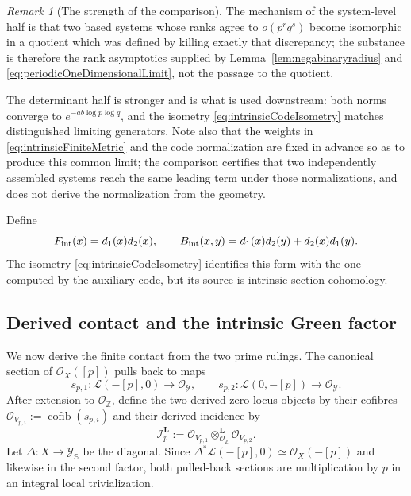 \documentclass[11pt]{amsart}
\theoremstyle{definition}
\theoremstyle{remark}
\newtheorem{remark}[theorem]{Remark}
\newcommand{\Z}{\mathbb Z}
\begin{document}
\begin{remark}[The strength of the comparison]
\label{rem:comparisonstrength}
The mechanism of the
system-level half is that two based systems whose ranks agree to $o(p^rq^s)$
become isomorphic in a quotient which was defined by killing exactly that
discrepancy; the substance is therefore the rank asymptotics supplied by
Lemma~\ref{lem:negabinaryradius} and
\eqref{eq:periodicOneDimensionalLimit}, not the passage to the quotient.

The determinant half is stronger and is what is used downstream: both norms
converge to $e^{-ab\log p\log q}$, and the isometry
\eqref{eq:intrinsicCodeIsometry} matches distinguished limiting generators.
Note also that the weights in \eqref{eq:intrinsicFiniteMetric} and the code
normalization are fixed in advance so as to produce this common limit; the
comparison certifies that two independently assembled systems reach the same
leading term under those normalizations, and does not derive the
normalization from the geometry.
\end{remark}

Define
\begin{equation}\label{eq:intrinsicRRform}
 F_{\rm int}(x)=d_1(x)d_2(x),\qquad
 B_{\rm int}(x,y)=d_1(x)d_2(y)+d_2(x)d_1(y).
\end{equation}
The isometry \eqref{eq:intrinsicCodeIsometry} identifies this form with the
one computed by the auxiliary code, but its source is intrinsic section
cohomology.


\subsection{Derived contact and the intrinsic Green factor}

We now derive the finite contact from the two prime rulings.  The canonical
section of $\mathcal O_X([p])$ pulls back to maps
\begin{equation}\label{eq:primeRulingSections}
 s_{p,1}:\mathcal L(-[p],0)\longrightarrow\mathcal O_{\mathscr Y},
 \qquad
 s_{p,2}:\mathcal L(0,-[p])\longrightarrow\mathcal O_{\mathscr Y}.
\end{equation}
After extension to $\mathcal O_{\Z}$, define the two derived zero-locus
objects by their cofibres
$\mathcal O_{V_{p,i}}:=\operatorname{cofib}(s_{p,i})$ and their derived
incidence by
\begin{equation}\label{eq:derivedPrimeIncidence}
 \mathcal I_p^{\mathbf L}:=
 \mathcal O_{V_{p,1}}\otimes_{\mathcal O_{\Z}}^{\mathbf L}
 \mathcal O_{V_{p,2}}.
\end{equation}
Let $\Delta:X\to\mathscr Y_{\mathbb S}$ be the diagonal.  Since
$\Delta^*\mathcal L(-[p],0)\simeq\mathcal O_X(-[p])$ and likewise in the
second factor, both pulled-back sections are multiplication by $p$ in an
integral local trivialization.
\end{document}
